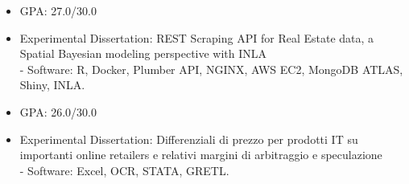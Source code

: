 \documentclass[10pt,a4paper,ragged2e]{altacv}
\begin{document}

\begin{fullwidth}
\makecvheader
\end{fullwidth}




\begin{itemize}
\item GPA: 27.0/30.0\\
\item Experimental Dissertation: REST Scraping API for Real Estate data, a Spatial Bayesian modeling perspective with INLA \\
\smallskip
- Software: R, Docker, Plumber API, NGINX, AWS EC2, MongoDB ATLAS, Shiny, INLA.
\end{itemize}

\divider

\begin{itemize}
\item GPA: 26.0/30.0\\
\item Experimental Dissertation: Differenziali di prezzo per prodotti IT
su importanti online retailers e relativi margini di arbitraggio e speculazione\\
\smallskip
- Software: Excel, OCR, STATA, GRETL.
\end{itemize}
\end{document}
